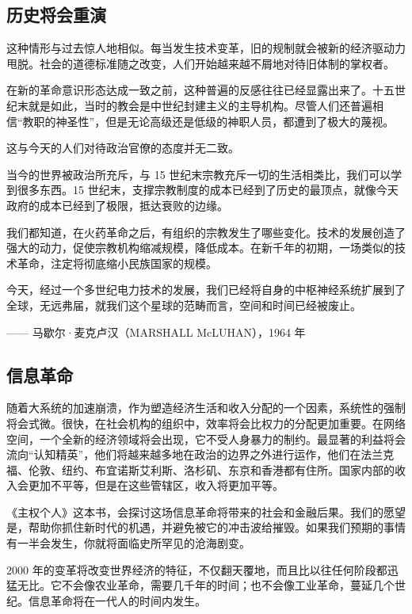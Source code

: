 \subsection{历史将会重演}
这种情形与过去惊人地相似。每当发生技术变革，旧的规制就会被新的经济驱动力甩脱。社会的道德标准随之改变，人们开始越来越不屑地对待旧体制的掌权者。


在新的革命意识形态达成一致之前，这种普遍的反感往往已经显露出来了。十五世纪末就是如此，当时的教会是中世纪封建主义的主导机构。尽管人们还普遍相信“教职的神圣性”，但是无论高级还是低级的神职人员，都遭到了极大的蔑视。


这与今天的人们对待政治官僚的态度并无二致。


当今的世界被政治所充斥，与 15 世纪末宗教充斥一切的生活相类比，我们可以学到很多东西。15 世纪末，支撑宗教制度的成本已经到了历史的最顶点，就像今天政府的成本已经到了极限，抵达衰败的边缘。


我们都知道，在火药革命之后，有组织的宗教发生了哪些变化。技术的发展创造了强大的动力，促使宗教机构缩减规模，降低成本。在新千年的初期，一场类似的技术革命，注定将彻底缩小民族国家的规模。



\begin{tcolorbox}
今天，经过一个多世纪电力技术的发展，我们已经将自身的中枢神经系统扩展到了全球，无远弗届，就我们这个星球的范畴而言，空间和时间已经被废止。
\begin{flushright}
—— 马歇尔·麦克卢汉（MARSHALL McLUHAN），1964 年
\end{flushright}
\end{tcolorbox}

\subsection{信息革命}
随着大系统的加速崩溃，作为塑造经济生活和收入分配的一个因素，系统性的强制将会式微。很快，在社会机构的组织中，效率将会比权力的分配更加重要。在网络空间，一个全新的经济领域将会出现，它不受人身暴力的制约。最显著的利益将会流向“认知精英”，他们将越来越多地在政治的边界之外进行运作，他们在法兰克福、伦敦、纽约、布宜诺斯艾利斯、洛杉矶、东京和香港都有住所。国家内部的收入会更加不平等，但是在这些管辖区，收入将更加平等。

《主权个人》这本书，会探讨这场信息革命将带来的社会和金融后果。我们的愿望是，帮助你抓住新时代的机遇，并避免被它的冲击波给摧毁。如果我们预期的事情有一半会发生，你就将面临史所罕见的沧海剧变。

2000 年的变革将改变世界经济的特征，不仅翻天覆地，而且比以往任何阶段都迅猛无比。它不会像农业革命，需要几千年的时间；也不会像工业革命，蔓延几个世纪。信息革命将在一代人的时间内发生。


